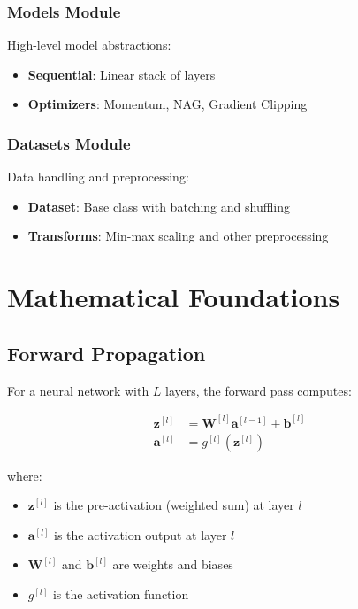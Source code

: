 \documentclass[12pt,a4paper]{article}
\begin{document}
\subsubsection{Models Module}
High-level model abstractions:
\begin{itemize}
    \item \textbf{Sequential}: Linear stack of layers
    \item \textbf{Optimizers}: Momentum, NAG, Gradient Clipping
\end{itemize}

\subsubsection{Datasets Module}
Data handling and preprocessing:
\begin{itemize}
    \item \textbf{Dataset}: Base class with batching and shuffling
    \item \textbf{Transforms}: Min-max scaling and other preprocessing
\end{itemize}

\section{Mathematical Foundations}

\subsection{Forward Propagation}

For a neural network with $L$ layers, the forward pass computes:

\begin{align}
\mathbf{z}^{[l]} &= \mathbf{W}^{[l]} \mathbf{a}^{[l-1]} + \mathbf{b}^{[l]} \\
\mathbf{a}^{[l]} &= g^{[l]}(\mathbf{z}^{[l]})
\end{align}

where:
\begin{itemize}
    \item $\mathbf{z}^{[l]}$ is the pre-activation (weighted sum) at layer $l$
    \item $\mathbf{a}^{[l]}$ is the activation output at layer $l$
    \item $\mathbf{W}^{[l]}$ and $\mathbf{b}^{[l]}$ are weights and biases
    \item $g^{[l]}$ is the activation function
\end{itemize}
\end{document}
